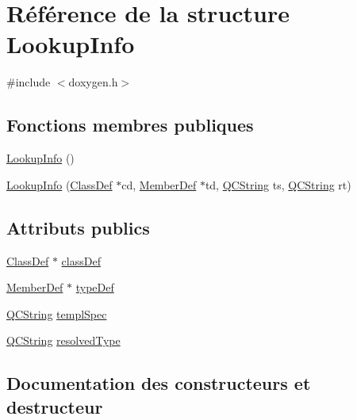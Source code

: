 \hypertarget{struct_lookup_info}{}\section{Référence de la structure Lookup\+Info}
\label{struct_lookup_info}


{\ttfamily \#include $<$doxygen.\+h$>$}

\subsection*{Fonctions membres publiques}
\begin{DoxyCompactItemize}
\item 
\hyperlink{struct_lookup_info_a36ba7b2f4cf22657857f4d4b52643ffe}{Lookup\+Info} ()
\item 
\hyperlink{struct_lookup_info_ad8c8472ab08313b27106fe293803dca7}{Lookup\+Info} (\hyperlink{class_class_def}{Class\+Def} $\ast$cd, \hyperlink{class_member_def}{Member\+Def} $\ast$td, \hyperlink{class_q_c_string}{Q\+C\+String} ts, \hyperlink{class_q_c_string}{Q\+C\+String} rt)
\end{DoxyCompactItemize}
\subsection*{Attributs publics}
\begin{DoxyCompactItemize}
\item 
\hyperlink{class_class_def}{Class\+Def} $\ast$ \hyperlink{struct_lookup_info_ab45ec9bb9bd250c808f84055cfb1b523}{class\+Def}
\item 
\hyperlink{class_member_def}{Member\+Def} $\ast$ \hyperlink{struct_lookup_info_a4d3180e6758e0a88e96f6ec5f80c07ec}{type\+Def}
\item 
\hyperlink{class_q_c_string}{Q\+C\+String} \hyperlink{struct_lookup_info_ab6109313beafe89f7d42431f8da344fb}{templ\+Spec}
\item 
\hyperlink{class_q_c_string}{Q\+C\+String} \hyperlink{struct_lookup_info_a55af5dfe2282dcc19615ac1e0ace76ff}{resolved\+Type}
\end{DoxyCompactItemize}


\subsection{Documentation des constructeurs et destructeur}
\hypertarget{struct_lookup_info_a36ba7b2f4cf22657857f4d4b52643ffe}{}
